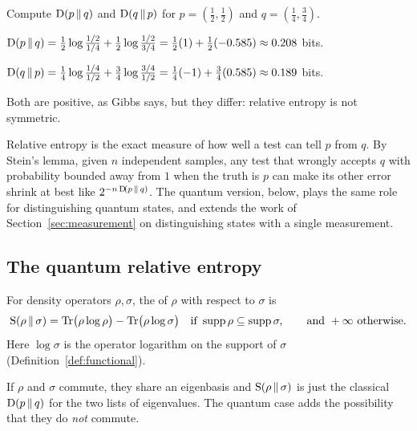 \begin{example}\label{ex:kl}
  Compute $\mathrm{D}\!\left(p\,\middle\|\,q\right)$ and $\mathrm{D}\!\left(q\,\middle\|\,p\right)$ for $p=(\tfrac12,\tfrac12)$ and $q=(\tfrac14,\tfrac34)$.
\end{example}
\begin{solution}
  \begin{steps}
    \item $\mathrm{D}\!\left(p\,\middle\|\,q\right)=\tfrac12\log\frac{1/2}{1/4}+\tfrac12\log\frac{1/2}{3/4}=\tfrac12(1)+\tfrac12(-0.585)\approx0.208$ bits.
    \item $\mathrm{D}\!\left(q\,\middle\|\,p\right)=\tfrac14\log\frac{1/4}{1/2}+\tfrac34\log\frac{3/4}{1/2}=\tfrac14(-1)+\tfrac34(0.585)\approx0.189$ bits.
  \end{steps}
  Both are positive, as Gibbs says, but they differ: relative entropy is not symmetric.
\end{solution}

\begin{lookahead}
  Relative entropy is the exact measure of how well a test can tell $p$ from $q$. By Stein's lemma, given $n$ independent samples, any test that wrongly accepts $q$ with probability bounded away from $1$ when the truth is $p$ can make its other error shrink at best like $2^{-n\,\mathrm{D}\!\left(p\,\middle\|\,q\right)}$. The quantum version, below, plays the same role for distinguishing quantum states, and extends the work of Section~\ref{sec:measurement} on distinguishing states with a single measurement.
\end{lookahead}

\subsection{The quantum relative entropy}

\begin{definition}\label{def:qre}
  For density operators $\rho,\sigma$, the  of $\rho$ with respect to $\sigma$ is
  \[
    \mathrm{S}\!\left(\rho\,\middle\|\,\sigma\right)=\operatorname{Tr}\bigl(\rho\log\rho\bigr)-\operatorname{Tr}\bigl(\rho\log\sigma\bigr)\quad\text{if }\operatorname{supp}\rho\subseteq\operatorname{supp}\sigma,\qquad\text{and }+\infty\text{ otherwise}.
  \]
  Here $\log\sigma$ is the operator logarithm on the support of $\sigma$ (Definition~\ref{def:functional}).
\end{definition}

If $\rho$ and $\sigma$ commute, they share an eigenbasis and $\mathrm{S}\!\left(\rho\,\middle\|\,\sigma\right)$ is just the classical $\mathrm{D}\!\left(p\,\middle\|\,q\right)$ for the two lists of eigenvalues. The quantum case adds the possibility that they do \emph{not} commute.

